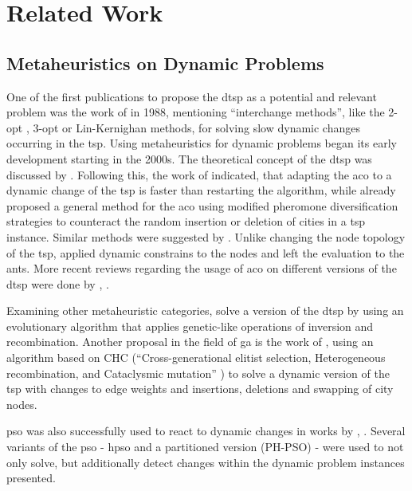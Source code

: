 
\chapter{Related Work}
\label{chap:related}

\section{Metaheuristics on Dynamic Problems}

One of the first publications to propose the \gls{dtsp} as a potential and relevant problem was the work of \citet{psaraftis1988dynamic} in 1988, mentioning \enquote{interchange methods}, like the 2-opt \cite{croes1958method}, 3-opt \cite{lin1965computer} or Lin-Kernighan \cite{lin1973effective} methods, for solving slow dynamic changes occurring in the \gls{tsp}.
Using metaheuristics for dynamic problems began its early development starting in the 2000s. The theoretical concept of the \gls{dtsp} was discussed by \citet{huang2001dynamic}. Following this, the work of \citet{angus2002ant} indicated, that adapting the \gls{aco} to a dynamic change of the \gls{tsp} is faster than restarting the algorithm, while \citet{guntsch2001pheromone} already proposed a general method for the \gls{aco} using modified pheromone diversification strategies to counteract the random insertion or deletion of cities in a \gls{tsp} instance. Similar methods were suggested by \citet{eyckelhof2002ant}.
Unlike changing the node topology of the \gls{tsp}, \citet{silva2004ant} applied dynamic constrains to the nodes and left the evaluation to the ants.
More recent reviews regarding the usage of \gls{aco} on different versions of the \gls{dtsp} were done by \citet{mavrovouniotis2013ant}, \cite{mavrovouniotis2016ant}.

Examining other metaheuristic categories, \citet{li2006new} solve a version of the \gls{dtsp} by using an evolutionary algorithm that applies genetic-like operations of inversion and recombination. Another proposal in the field of \gls{ga} is the work of \citet{simoes2011chc}, using an algorithm based on CHC  (\enquote{Cross-generational elitist selection, Heterogeneous recombination, and Cataclysmic mutation} \cite{eshelman1991chc}) to solve a dynamic version of the \gls{tsp} with changes to edge weights and insertions, deletions and swapping of city nodes.

\gls{pso} was also successfully used to react to dynamic changes in works by \citet{janson2004hierarchical},  \cite{janson2006hierarchical}. Several variants of the \gls{pso} - \gls{hpso} and a partitioned version (PH-PSO) - were used to not only solve, but additionally detect changes within the dynamic problem instances presented.

